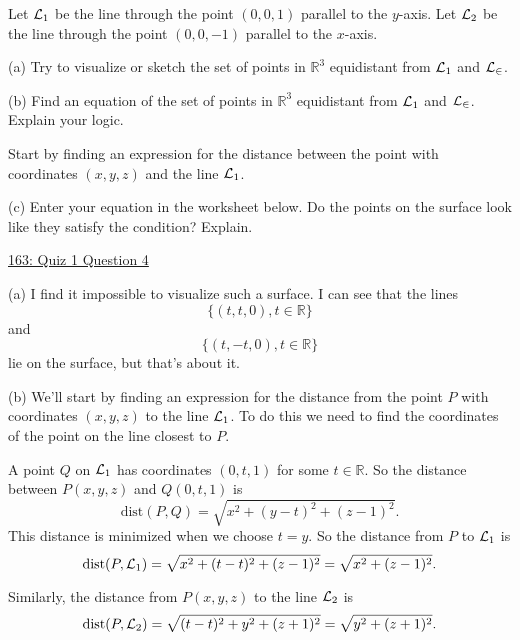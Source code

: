 \documentclass{ximera}
\begin{document}
\begin{question}  \label{Qpo8873032}
Let ${\cal L}_1$ be the line through the point $(0,0,1)$ parallel to the $y$-axis. Let ${\cal L}_2$ be the line through the point $(0,0,-1)$ parallel to the $x$-axis.

(a) Try to visualize or sketch the set of points in $\mathbb{R}^3$ equidistant from ${\cal L}_1$ and ${\cal L_2}$.

(b) Find an equation of the set of points in $\mathbb{R}^3$ equidistant from ${\cal L}_1$ and ${\cal L_2}$. Explain your logic.

\begin{hint}
Start by finding an expression for the distance between the point with coordinates $(x,y,z)$ and the line ${\cal L}_1$.
\end{hint}

(c) Enter  your equation in the worksheet below. Do the points on the surface look like they satisfy the condition? Explain.

\begin{onlineOnly}
    \begin{center}
\end{center}
\end{onlineOnly}

\href{https://www.desmos.com/3d/pzksnds2pe}{163: Quiz 1 Question 4}


\begin{explanation}

(a) I find it impossible to visualize such a surface. I can see that the lines
\[
      \{ (t,t,0) , t \in \mathbb{R}   \}
\]
and
\[
      \{ (t,-t,0) , t \in \mathbb{R}   \}
\]
lie on the surface, but that's about it.   %

(b) We'll start by finding an expression for the distance from the point $P$ with coordinates $(x,y,z)$ to the line ${\cal L}_1$. To do this we need to find the coordinates of the point on the line closest to $P$.

A point $Q$ on ${\cal L}_1$ has coordinates $(0,t,1)$ for some $t\in \mathbb{R}$. So the distance between $P(x,y,z)$ and $Q(0,t,1)$ is 
\[
       \text{dist}(P,Q) = \sqrt{x^2 + (y-t)^2 + (z-1)^2} .
\] 
This distance is minimized when we choose $t=y$. So the distance from $P$ to ${\cal L}_1$ is
\[
        \text{dist}(P,{\cal L}_1) = \sqrt{x^2 + (t-t)^2 + (z-1)^2} = \sqrt{x^2 + (z-1)^2} .
\]

Similarly, the distance from $P(x,y,z)$ to the line ${\cal L}_2$ is
\[
        \text{dist}(P,{\cal L}_2) = \sqrt{(t-t)^2 + y^2 + (z+1)^2} = \sqrt{y^2 + (z+1)^2} .
\]


\end{explanation}
\end{question}
\end{document}
